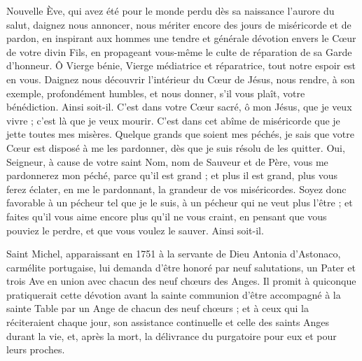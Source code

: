 \documentclass{bibliotheca-missel}
\begin{document}
Nouvelle Ève, qui avez été pour le monde perdu dès sa naissance l’aurore du salut, daignez nous annoncer, nous mériter encore des jours de miséricorde et de pardon, en inspirant aux hommes une tendre et générale dévotion envers le Cœur de votre divin Fils, en propageant vous-même le culte de réparation de sa Garde d’honneur. Ô Vierge bénie, Vierge médiatrice et réparatrice, tout notre espoir est en vous. Daignez nous découvrir l’intérieur du Cœur de Jésus, nous rendre, à son exemple, profondément humbles, et nous donner, s’il vous plaît, votre bénédiction. Ainsi soit-il.
\priere C’est dans votre Cœur sacré, ô mon Jésus, que je veux vivre ; c’est là que je veux mourir. C’est dans cet abîme de miséricorde que je jette toutes mes misères. Quelque grands que soient mes péchés, je sais que votre Cœur est disposé à me les pardonner, dès que je suis résolu de les quitter. Oui, Seigneur, à cause de votre saint Nom, nom de Sauveur et de Père, vous me pardonnerez mon péché, parce qu’il est grand ; et plus il est grand, plus vous ferez éclater, en me le pardonnant, la grandeur de vos miséricordes. Soyez donc favorable à un pécheur tel que je le suis, à un pécheur qui ne veut plus l’être ; et faites qu’il vous aime encore plus qu’il ne vous craint, en pensant que vous pouviez le perdre, et que vous voulez le sauver. Ainsi soit-il.
\culdelampe


\begin{notice}
Saint Michel, apparaissant en 1751 à la servante de Dieu Antonia d’Astonaco, carmélite portugaise, lui demanda d’être honoré par neuf salutations, un Pater et trois Ave en union avec chacun des neuf chœurs des Anges. Il promit à quiconque pratiquerait cette dévotion avant la sainte communion d’être accompagné à la sainte Table par un Ange de chacun des neuf chœurs ; et à ceux qui la réciteraient chaque jour, son assistance continuelle et celle des saints Anges durant la vie, et, après la mort, la délivrance du purgatoire pour eux et pour leurs proches.
\end{notice}
\culdelampe
\end{document}
